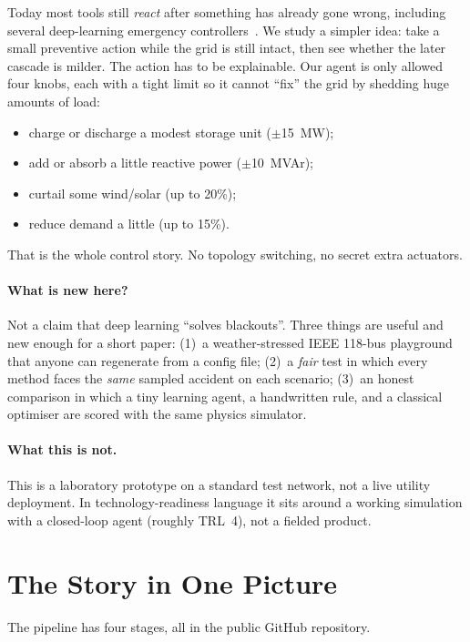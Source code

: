 \documentclass[conference]{IEEEtran}
\begin{document}
Today most tools still \emph{react} after something has already gone wrong, including several deep-learning emergency controllers~\cite{b2}. We study a simpler idea: take a small preventive action while the grid is still intact, then see whether the later cascade is milder. The action has to be explainable. Our agent is only allowed four knobs, each with a tight limit so it cannot ``fix'' the grid by shedding huge amounts of load:

\begin{itemize}
\item charge or discharge a modest storage unit ($\pm$15~MW);
\item add or absorb a little reactive power ($\pm$10~MVAr);
\item curtail some wind/solar (up to 20\%);
\item reduce demand a little (up to 15\%).
\end{itemize}

That is the whole control story. No topology switching, no secret extra actuators.

\paragraph{What is new here?}
Not a claim that deep learning ``solves blackouts''. Three things are useful and new enough for a short paper: (1)~a weather-stressed IEEE 118-bus playground that anyone can regenerate from a config file; (2)~a \emph{fair} test in which every method faces the \emph{same} sampled accident on each scenario; (3)~an honest comparison in which a tiny learning agent, a handwritten rule, and a classical optimiser are scored with the same physics simulator.

\paragraph{What this is not.}
This is a laboratory prototype on a standard test network, not a live utility deployment. In technology-readiness language it sits around a working simulation with a closed-loop agent (roughly TRL~4), not a fielded product.

\section{The Story in One Picture}

The pipeline has four stages, all in the public GitHub repository.
\end{document}
